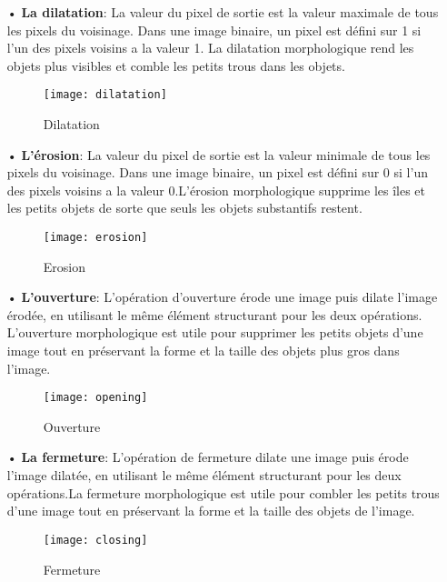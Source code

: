     \begin{itemize}
        \item[•]\textbf{La dilatation}: La valeur du pixel de sortie est la valeur maximale de tous les pixels du voisinage. Dans une image binaire, un pixel est défini sur 1 si l'un des pixels voisins a la valeur 1. La dilatation morphologique rend les objets plus visibles et comble les petits trous dans les objets.
        \begin{figure}[H]
            \centering
            \texttt{[image: dilatation]}
            \caption{Dilatation}
        \end{figure}  
       
        \item[•]\textbf{L'érosion}: La valeur du pixel de sortie est la valeur minimale de tous les pixels du voisinage. Dans une image binaire, un pixel est défini sur 0 si l'un des pixels voisins a la valeur 0.L'érosion morphologique supprime les îles et les petits objets de sorte que seuls les objets substantifs restent. 
        \begin{figure}[H]
            \centering
            \texttt{[image: erosion]}
            \caption{Erosion}
        \end{figure}  
        \item[•]\textbf{L'ouverture}: L'opération d'ouverture érode une image puis dilate l'image érodée, en utilisant le même élément structurant pour les deux opérations. L'ouverture morphologique est utile pour supprimer les petits objets d'une image tout en préservant la forme et la taille des objets plus gros dans l'image. 
            \begin{figure}[H]
                \centering
                \texttt{[image: opening]}
                \caption{Ouverture}
            \end{figure} 
        \item[•]\textbf{La fermeture}: L'opération de fermeture dilate une image puis érode l'image dilatée, en utilisant le même élément structurant pour les deux opérations.La fermeture morphologique est utile pour combler les petits trous d'une image tout en préservant la forme et la taille des objets de l'image.\cite{mathlabMorpho}
        \begin{figure}[H]
            \centering
            \texttt{[image: closing]}
            \caption{Fermeture}
        \end{figure} 
    \end{itemize} 

